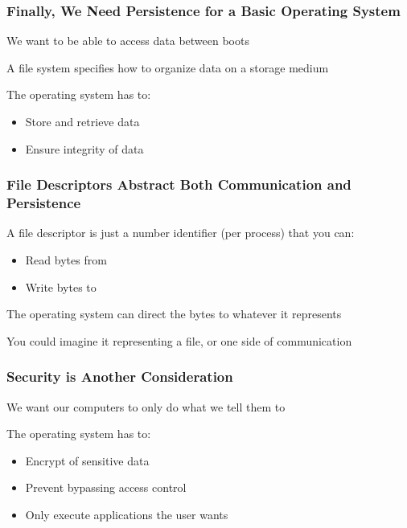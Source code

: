   \begin{frame}
    \frametitle{Finally, We Need Persistence for a Basic Operating System}

    We want to be able to access data between boots

    \vspace{2em}

    A file system specifies how to organize data on a storage medium

    \vspace{4em}
    
    The operating system has to:
    \begin{itemize}
      \item Store and retrieve data
      \item Ensure integrity of data
    \end{itemize}
  \end{frame}

  \begin{frame}
    \frametitle{File Descriptors Abstract Both Communication and Persistence}

    A file descriptor is just a number identifier (per process) that you can:
    \begin{itemize}
      \item Read bytes from
      \item Write bytes to 
    \end{itemize}

    \vspace{4em}

    The operating system can direct the bytes to whatever it represents

    \vspace{2em}

    You could imagine it representing a file, or one side of communication
  \end{frame}

  \begin{frame}
    \frametitle{Security is Another Consideration}

    We want our computers to only do what we tell them to

    \vspace{4em}

    The operating system has to:
    \begin{itemize}
      \item Encrypt of sensitive data
      \item Prevent bypassing access control
      \item Only execute applications the user wants
    \end{itemize}
  \end{frame}

